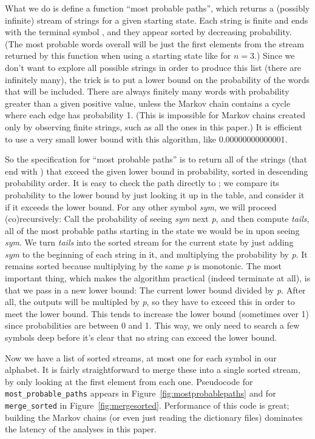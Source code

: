 \documentclass[twocolumn]{article}
\begin{document}
What we do is define a function ``most probable paths'', which returns
a (possibly infinite) stream of strings for a given starting state.
Each string is finite and ends with the terminal symbol \>, and they
appear sorted by decreasing probability. (The most probable words
overall will be just the first elements from the stream returned by
this function when using a starting state like \<\<\< for $n=3$.)
Since we don't want to explore all possible strings in order to
produce this list (there are infinitely many), the trick is to put a
lower bound on the probability of the words that will be included.
There are always finitely many words with probability greater than a
given positive value, unless the Markov chain contains a cycle where
each edge has probability 1. (This is impossible for Markov chains
created only by observing finite strings, such as all the ones in this
paper.) It is efficient to use a very small lower bound with this
algorithm, like 0.00000000000001.

So the specification for ``most probable paths'' is to return all of
the strings (that end with \>) that exceed the given lower bound in
probability, sorted in descending probability order. It is easy to
check the path directly to \>; we compare its probability to the lower
bound by just looking it up in the table, and consider it if it
exceeds the lower bound. For any other symbol {\it sym}, we will
proceed (co)recursively: Call the probability of seeing {\it sym} next
{\it p}, and then compute {\it tails}, all of the most probable paths
starting in the state we would be in upon seeing {\it sym}. We turn
{\it tails} into the sorted stream for the current state by just
adding {\it sym} to the beginning of each string in it, and
multiplying the probability by {\it p}. It remains sorted because
multiplying by the same {\it p} is monotonic. The most important
thing, which makes the algorithm practical (indeed terminate at all),
is that we pass in a new lower bound: The current lower bound divided
by {\it p}. After all, the outputs will be multipled by {\it p}, so
they have to exceed this in order to meet the lower bound. This tends
to increase the lower bound (sometimes over 1) since probabilities are
between 0 and 1. This way, we only need to search a few symbols deep
before it's clear that no string can exceed the lower bound.

Now we have a list of sorted streams, at most one for each symbol in
our alphabet. It is fairly straightforward to merge these into a
single sorted stream, by only looking at the first element from each
one. Pseudocode for {\tt most\_probable\_paths} appears in
Figure~\ref{fig:mostprobablepaths} and for {\tt merge\_sorted} in
Figure~\ref{fig:mergesorted}. Performance of this code is great;
building the Markov chains (or even just reading the dictionary files)
dominates the latency of the analyses in this paper.
\end{document}
